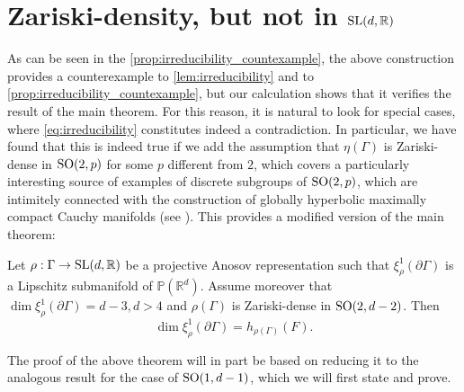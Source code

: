 \documentclass{report}
\begin{document}
\section{Zariski-density, but not in $\operatorname{{\mathrm{SL}}}(d,\mathbb R)$}
As can be seen in the \cref{prop:irreducibility_countexample}, the above construction provides a counterexample to \cref{lem:irreducibility} and to \cref{prop:irreducibility_countexample}, but our calculation shows that it verifies the result of the main theorem.
For this reason, it is natural to look for special cases, where \cref{eq:irreducibility} constitutes indeed a contradiction.
In particular, we have found that this is indeed true if we add the assumption that $\eta(\Gamma)$ is Zariski-dense in $\operatorname{{\mathrm{SO}}}(2,p)$ for some $p$ different from $2$, which covers a particularly interesting source of examples of discrete subgroups of $\operatorname{{\mathrm{SO}}}(2,p)$, which are intimitely connected with the construction of globally hyperbolic maximally compact Cauchy manifolds (see \cite{monclair2023gromov}).
This provides a modified version of the main theorem:
\begin{theorem}\label{thm:main_anti_de_sitter}
    Let $\rho: \Gamma \to \operatorname{{\mathrm{SL}}}(d, \mathbb R)$ be a projective Anosov representation such that $\xi^1_\rho(\partial \Gamma)$ is a Lipschitz submanifold of $\mathbb P(\mathbb R^d)$.
    Assume moreover that $\dim \xi_\rho^1(\partial \Gamma) = d-3, d > 4$ and $\rho(\Gamma)$ is Zariski-dense in $\operatorname{{\mathrm{SO}}}(2,d-2)$.
    Then
    \[
        \dim \xi_\rho^1(\partial \Gamma) = h_{\rho(\Gamma)}(F).
    \]
\end{theorem}
The proof of the above theorem will in part be based on reducing it to the analogous result for the case of $\operatorname{{\mathrm{SO}}}(1, d-1)$, which we will first state and prove.
\end{document}
